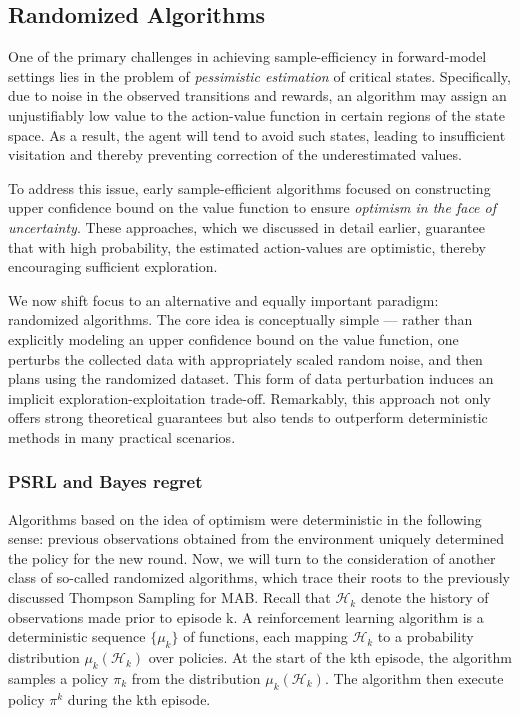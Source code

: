 \documentclass{article}
\numberwithin{equation}{section}
\begin{document}
\subsection{Randomized Algorithms}
One of the primary challenges in achieving sample-efficiency in forward-model settings lies in the problem of \textit{pessimistic estimation} of critical states. Specifically, due to noise in the observed transitions and rewards, an algorithm may assign an unjustifiably low value to the action-value function in certain regions of the state space. As a result, the agent will tend to avoid such states, leading to insufficient visitation and thereby preventing correction of the underestimated values. 

To address this issue, early sample-efficient algorithms focused on constructing upper confidence bound on the value function to ensure \textit{optimism in the face of uncertainty}. These approaches, which we discussed in detail earlier, guarantee that with high probability, the estimated action-values are optimistic, thereby encouraging sufficient exploration.

We now shift focus to an alternative and equally important paradigm: randomized algorithms. The core idea is conceptually simple — rather than explicitly modeling an upper confidence bound on the value function, one perturbs the collected data with appropriately scaled random noise, and then plans using the randomized dataset. This form of data perturbation induces an implicit exploration-exploitation trade-off. Remarkably, this approach not only offers strong theoretical guarantees but also tends to outperform deterministic methods in many practical scenarios.
\subsubsection{PSRL and Bayes regret}
Algorithms based on the idea of optimism were deterministic in the following sense: previous observations obtained from the environment uniquely determined the policy for the new round. Now, we will turn to the consideration of another class of so-called randomized algorithms, which trace their roots to the previously discussed Thompson Sampling for MAB. Recall that $\mathcal{H}_k$  denote the history of observations made prior to episode k. A reinforcement learning algorithm is a deterministic sequence \(\{\mu_k\}\) of functions,
each mapping \(\mathcal{H}_k\)
to a probability distribution \(\mu_k(\mathcal{H}_k)\) over policies. At the start of the kth
episode, the algorithm samples a policy \(\pi_k\) from the distribution \(\mu_k(\mathcal{H}_k)\). The algorithm
then execute policy \(\pi^k\) during the kth episode.
\end{document}
